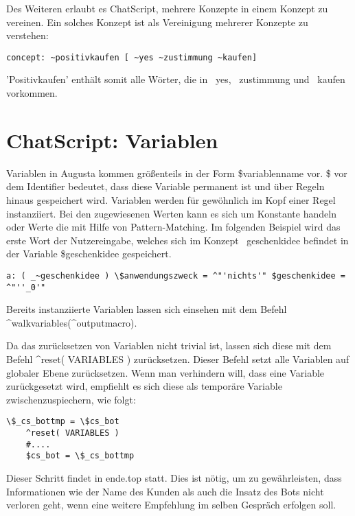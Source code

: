 Des Weiteren erlaubt es ChatScript, mehrere Konzepte in einem Konzept zu vereinen. Ein solches Konzept ist als Vereinigung mehrerer Konzepte zu verstehen:

\begin{lstlisting}[caption={Konzept 'positivkaufen' aus konzepte.top}]
concept: ~positivkaufen [ ~yes ~zustimmung ~kaufen]
\end{lstlisting}

'Positivkaufen' enthält somit alle Wörter, die in ~yes, ~zustimmung und ~kaufen vorkommen. 

\section{ChatScript: Variablen}
\label{sec:ChatScript: Variablen}
Variablen in Augusta kommen größenteils in der Form \$variablenname vor. \$ vor dem Identifier bedeutet, dass diese Variable permanent ist und über Regeln hinaus gespeichert wird. Variablen werden für gewöhnlich im Kopf einer Regel instanziiert. Bei den zugewiesenen Werten kann es sich um Konstante handeln oder Werte die mit Hilfe von Pattern-Matching. Im folgenden Beispiel wird das erste Wort der Nutzereingabe, welches sich im Konzept ~geschenkidee befindet in der Variable \$geschenkidee gespeichert. 

\begin{lstlisting}[caption={Zuweisung des Wertes einer Variable }]
a: ( _~geschenkidee ) \$anwendungszweck = ^"'nichts'" $geschenkidee = ^"''_0'"
\end{lstlisting}

\textdollar

Bereits instanziierte Variablen lassen sich einsehen mit dem Befehl ^walkvariables(^outputmacro). 

Da das zurücksetzen von Variablen nicht trivial ist, lassen sich diese mit dem Befehl ^reset( VARIABLES ) zurücksetzen. Dieser Befehl setzt alle Variablen auf globaler Ebene zurücksetzen. Wenn man verhindern will, dass eine Variable zurückgesetzt wird, empfiehlt es sich diese als temporäre Variable zwischenzuspiechern, wie folgt:

\begin{lstlisting}[caption={Zwischenspeichern einer Variable}]
	\$_cs_bottmp = \$cs_bot
    ^reset( VARIABLES )
    #....
	$cs_bot = \$_cs_bottmp 
\end{lstlisting}

Dieser Schritt findet in ende.top statt. Dies ist nötig, um zu gewährleisten, dass Informationen wie der Name des Kunden als auch die Insatz des Bots nicht verloren geht, wenn eine weitere Empfehlung im selben Gespräch erfolgen soll. 

